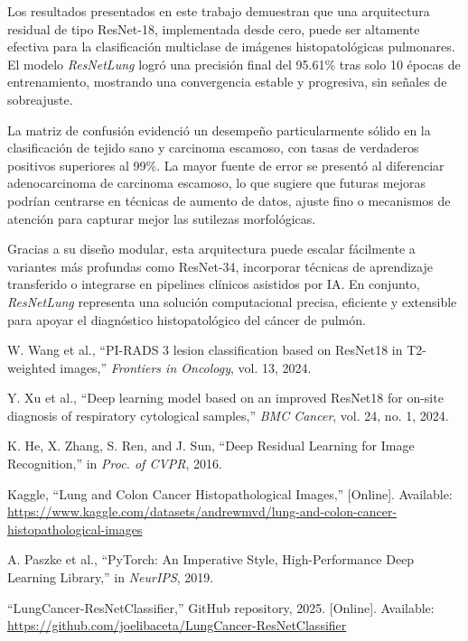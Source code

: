 \documentclass[conference]{IEEEtran}
\begin{document}
Los resultados presentados en este trabajo demuestran que una arquitectura residual de tipo ResNet-18, implementada desde cero, puede ser altamente efectiva para la clasificación multiclase de imágenes histopatológicas pulmonares. El modelo \textit{ResNetLung} logró una precisión final del 95.61\% tras solo 10 épocas de entrenamiento, mostrando una convergencia estable y progresiva, sin señales de sobreajuste.

La matriz de confusión evidenció un desempeño particularmente sólido en la clasificación de tejido sano y carcinoma escamoso, con tasas de verdaderos positivos superiores al 99\%. La mayor fuente de error se presentó al diferenciar adenocarcinoma de carcinoma escamoso, lo que sugiere que futuras mejoras podrían centrarse en técnicas de aumento de datos, ajuste fino o mecanismos de atención para capturar mejor las sutilezas morfológicas.

Gracias a su diseño modular, esta arquitectura puede escalar fácilmente a variantes más profundas como ResNet-34, incorporar técnicas de aprendizaje transferido o integrarse en pipelines clínicos asistidos por IA. En conjunto, \textit{ResNetLung} representa una solución computacional precisa, eficiente y extensible para apoyar el diagnóstico histopatológico del cáncer de pulmón.


\begin{thebibliography}{1}

W. Wang et al., ``PI-RADS 3 lesion classification based on ResNet18 in T2-weighted images,'' \emph{Frontiers in Oncology}, vol. 13, 2024.

Y. Xu et al., ``Deep learning model based on an improved ResNet18 for on-site diagnosis of respiratory cytological samples,'' \emph{BMC Cancer}, vol. 24, no. 1, 2024.

K. He, X. Zhang, S. Ren, and J. Sun, ``Deep Residual Learning for Image Recognition,'' in \emph{Proc. of CVPR}, 2016.

Kaggle, ``Lung and Colon Cancer Histopathological Images,'' [Online]. Available: \url{https://www.kaggle.com/datasets/andrewmvd/lung-and-colon-cancer-histopathological-images}

A. Paszke et al., ``PyTorch: An Imperative Style, High-Performance Deep Learning Library,'' in \emph{NeurIPS}, 2019.

 ``LungCancer-ResNetClassifier,'' GitHub repository, 2025. [Online]. Available: \url{https://github.com/joelibaceta/LungCancer-ResNetClassifier}

\end{thebibliography}
\end{document}
